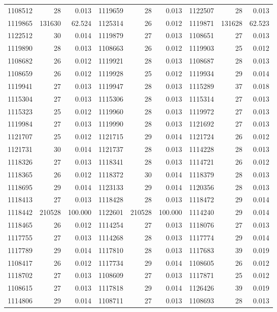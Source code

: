 \documentclass[11pt,a4paper]{article}
\begin{document}
\begin{longtable}{rrr|rrr|rrr}
1108512 & 28 & 0.013 & 1119659 & 28 & 0.013 & 1122507 & 28 & 0.013\\
1119865 & 131630 & 62.524 & 1125314 & 26 & 0.012 & 1119871 & 131628 & 62.523\\
1122512 & 30 & 0.014 & 1119879 & 27 & 0.013 & 1108651 & 27 & 0.013\\
1119890 & 28 & 0.013 & 1108663 & 26 & 0.012 & 1119903 & 25 & 0.012\\
1108682 & 26 & 0.012 & 1119921 & 28 & 0.013 & 1108687 & 28 & 0.013\\
1108659 & 26 & 0.012 & 1119928 & 25 & 0.012 & 1119934 & 29 & 0.014\\
1119941 & 27 & 0.013 & 1119947 & 28 & 0.013 & 1115289 & 37 & 0.018\\
1115304 & 27 & 0.013 & 1115306 & 28 & 0.013 & 1115314 & 27 & 0.013\\
1115323 & 25 & 0.012 & 1119960 & 28 & 0.013 & 1119972 & 27 & 0.013\\
1119984 & 27 & 0.013 & 1119990 & 28 & 0.013 & 1121692 & 27 & 0.013\\
1121707 & 25 & 0.012 & 1121715 & 29 & 0.014 & 1121724 & 26 & 0.012\\
1121731 & 30 & 0.014 & 1121737 & 28 & 0.013 & 1114228 & 28 & 0.013\\
1118326 & 27 & 0.013 & 1118341 & 28 & 0.013 & 1114721 & 26 & 0.012\\
1118365 & 26 & 0.012 & 1118372 & 30 & 0.014 & 1118379 & 28 & 0.013\\
1118695 & 29 & 0.014 & 1123133 & 29 & 0.014 & 1120356 & 28 & 0.013\\
1118413 & 27 & 0.013 & 1118428 & 28 & 0.013 & 1118472 & 29 & 0.014\\
1118442 & 210528 & 100.000 & 1122601 & 210528 & 100.000 & 1114240 & 29 & 0.014\\
1118465 & 26 & 0.012 & 1114254 & 27 & 0.013 & 1118076 & 27 & 0.013\\
1117755 & 27 & 0.013 & 1114268 & 28 & 0.013 & 1117774 & 29 & 0.014\\
1117789 & 29 & 0.014 & 1117810 & 28 & 0.013 & 1117683 & 39 & 0.019\\
1108417 & 26 & 0.012 & 1117734 & 29 & 0.014 & 1108605 & 26 & 0.012\\
1118702 & 27 & 0.013 & 1108609 & 27 & 0.013 & 1117871 & 25 & 0.012\\
1108615 & 27 & 0.013 & 1117818 & 29 & 0.014 & 1126426 & 39 & 0.019\\
1114806 & 29 & 0.014 & 1108711 & 27 & 0.013 & 1108693 & 28 & 0.013\\

\end{longtable}
\end{document}
